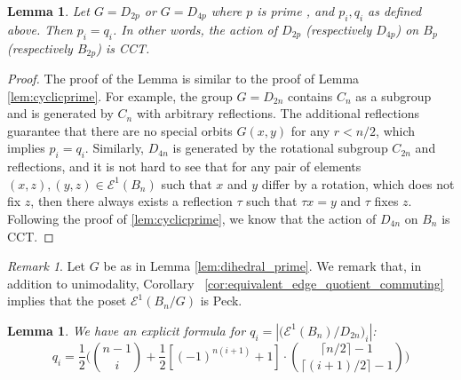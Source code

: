 \documentclass[10 pt]{amsart}
\theoremstyle{plain}
\newtheorem{lem}[thm]{Lemma}
\theoremstyle{definition}
\theoremstyle{remark}
\newtheorem{rem}[thm]{Remark}
\numberwithin{equation}{section}
\begin{document}
\begin{lem}{\label{lem:dihedral_prime}}
Let $G = D_{2p}$ or $G = D_{4p}$ where $p$ is prime , and $p_i, q_i$ as defined above. Then $p_i = q_i$. In other words, the action of $D_{2p}$ (respectively $D_{4p}$) on $B_p$ (respectively $B_{2p} $) is CCT. 
\end{lem}

\begin{proof}
The proof of the Lemma is similar to the proof of Lemma \ref{lem:cyclicprime}. For example, the group $G = D_{2n}$ contains $C_n$ as a subgroup and is generated by $C_n$ with arbitrary reflections. The additional reflections guarantee that there are no special orbits $G(x , y)$ for any $r < n/2$, which implies $p_i = q_i$. Similarly, $D_{4n}$ is generated by the rotational subgroup $C_{2n}$ and reflections, and it is not hard to see that for any pair of elements $(x, z), (y, z) \in \mathcal E^1(B_n)$ such that $x$ and $y$ differ by a rotation, which does not fix $z$, then there always exists a reflection $\tau$ such that $\tau x = y$ and $\tau$ fixes $z$. 
 Following the proof of \ref{lem:cyclicprime}, we know that the action of $D_{4n}$ on $B_n$ is CCT.
\end{proof}

\begin{rem}
Let $G$ be as in Lemma \ref{lem:dihedral_prime}. We remark that, in addition to unimodality, Corollary ~\ref{cor:equivalent_edge_quotient_commuting} implies that the poset $\mathcal E^1(B_n/G)$ is Peck.
\end{rem}


\begin{lem}{\label{dihedral002}}
 We have an explicit formula for $q_i = |\big(\mathcal E^1 (B_n)/D_{2n} \big)_i|$:
 $$q_i = \frac{1}{2} \Big( {n-1 \choose i } + \frac{1}{2} [(-1)^{n(i+1)}+1] \cdot { \lceil n/2\rceil -1  \choose \lceil (i+1)/2 \rceil - 1}  \Big)$$
\end{lem}
\end{document}
